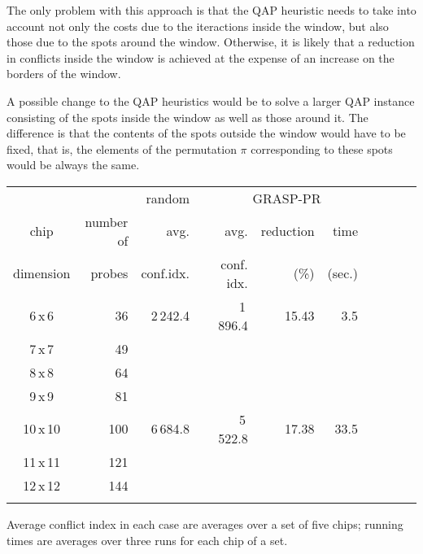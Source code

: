 \documentclass{bioinfo}
\begin{document}
The only problem with this approach is that the QAP heuristic needs to take into account not only the costs due to the iteractions inside the window, but also those due to the spots around the window. Otherwise, it is likely that a reduction in conflicts inside the window is achieved at the expense of an increase on the borders of the window.

A possible change to the QAP heuristics would be to solve a larger QAP instance consisting of the spots inside the window as well as those around it. The difference is that the contents of the spots outside the window would have to be fixed, that is, the elements of the permutation $\pi$ corresponding to these spots would be always the same.

\begin{table}[t]
{\begin{tabular}{crrcrrrcrrr} \toprule
          &            & random    & & \multicolumn{3}{c}{GRASP-PR}  \\ \cline{3-3} \cline{5-7}
chip      & number of  & avg.      & & avg.       & reduction & time   \\
dimension & probes     & conf.idx. & & conf. idx. & (\%)      & (sec.) \\ \midrule
6\,x\,6 & 36 & 2\,242.4 & & 1\,896.4 & 15.43 & 3.5 \\
7\,x\,7 & 49 & & & & & \\
8\,x\,8 & 64 & & & & & \\
9\,x\,9 & 81 & & & & & \\
10\,x\,10 & 100 & 6\,684.8 & & 5\,522.8 & 17.38 & 33.5 \\
11\,x\,11 & 121 & & & & & \\
12\,x\,12 & 144 & & & & & \\ \botrule
\end{tabular}}{Average conflict index in each case are averages over a set of five chips; running times are averages over three runs for each chip of a set.}
\end{table}
\end{document}
